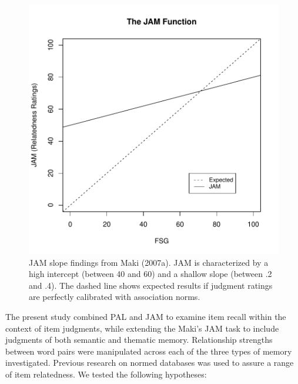 \documentclass[english,man]{apa6}
\theoremstyle{definition}
\theoremstyle{definition}
\theoremstyle{remark}
\begin{document}
\begin{figure}[htbp]
\centering
\includegraphics{max_buch_JOL_files/figure-latex/unnamed-chunk-2-1.pdf}
\caption{\label{fig:unnamed-chunk-2}JAM slope findings from Maki (2007a).
JAM is characterized by a high intercept (between 40 and 60) and a
shallow slope (between .2 and .4). The dashed line shows expected
results if judgment ratings are perfectly calibrated with association
norms.}
\end{figure}

The present study combined PAL and JAM to examine item recall within the
context of item judgments, while extending the Maki's JAM task to
include judgments of both semantic and thematic memory. Relationship
strengths between word pairs were manipulated across each of the three
types of memory investigated. Previous research on normed databases was
used to assure a range of item relatedness. We tested the following
hypotheses:
\end{document}
